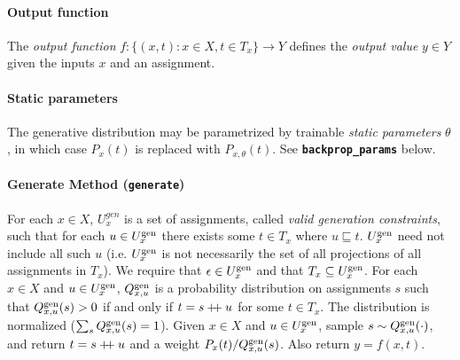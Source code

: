 \documentclass{article}
\newcommand{\code}[1]{\texttt{\small{\textbf{#1}}}}
\newcommand\doubleplus{\mathbin{+\mkern-5mu+}}
\newcommand{\concat}[0]{\doubleplus}
\newcommand{\emptyassignment}[0]{\epsilon}
\newcommand{\gen}[0]{\mbox{\scriptsize gen}}
\newcommand{\contained}[0]{\sqsubseteq}
\begin{document}
\paragraph{Output function}
The \emph{output function} $f : \{(x, t) : x \in X, t \in T_x\} \to Y$ defines the \emph{output value} $y \in Y$ given the inputs $x$ and an assignment.

\paragraph{Static parameters}
The generative distribution may be parametrized by trainable \emph{static parameters} $\theta$, in which case $P_x(t)$ is replaced with $P_{x,\theta}(t)$.
See \code{backprop\_params} below.



\paragraph{Generate Method (\code{generate})}
For each $x \in X$, $U^{gen}_x$ is a set of assignments, called \emph{valid generation constraints}, such that for each $u \in U^{\gen}_x$ there exists some $t \in T_x$ where $u \contained t$.
$U^{\gen}_x$ need not include all such $u$ (i.e. $U^{\gen}_x$ is not necessarily the set of all projections of all assignments in $T_x$).
We require that $\emptyassignment \in U^{\gen}_x$ and that $T_x \subseteq U^{\gen}_x$.
For each $x \in X$ and $u \in U^{\gen}_x$, $Q^{\gen}_{x,u}$ is a probability distribution on assignments $s$ such that $Q^{\gen}_{x,u}(s) > 0$ if and only if $t = s \concat u$ for some $t \in T_x$.
The distribution is normalized ($\sum_s Q^{\gen}_{x,u}(s) = 1$).
Given $x \in X$ and $u \in U^{\gen}_x$, sample $s \sim Q^{\gen}_{x,u}(\cdot)$, and return $t = s \concat u$ and a weight $P_x(t) / Q^{\gen}_{x,u}(s)$.
Also return $y = f(x, t)$.
\end{document}

